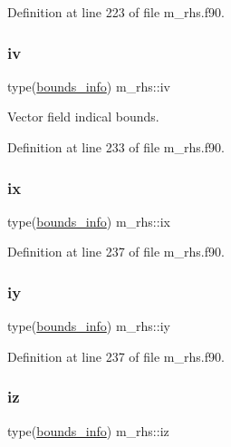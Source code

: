 Definition at line 223 of file m\+\_\+rhs.\+f90.

\mbox{\label{namespacem__rhs_a4ab97e22609b5ebbb97524ca7bae05ef}} 
\subsubsection{\texorpdfstring{iv}{iv}}
{\footnotesize\ttfamily type(\hyperlink{structm__derived__types_1_1bounds__info}{bounds\+\_\+info}) m\+\_\+rhs\+::iv}



Vector field indical bounds. 



Definition at line 233 of file m\+\_\+rhs.\+f90.

\mbox{\label{namespacem__rhs_a25b43c26b2e6ed431b9ec51d6af30c74}} 
\subsubsection{\texorpdfstring{ix}{ix}}
{\footnotesize\ttfamily type(\hyperlink{structm__derived__types_1_1bounds__info}{bounds\+\_\+info}) m\+\_\+rhs\+::ix}



Definition at line 237 of file m\+\_\+rhs.\+f90.

\mbox{\label{namespacem__rhs_a3d9a864b60496c110f161a93eebc86c6}} 
\subsubsection{\texorpdfstring{iy}{iy}}
{\footnotesize\ttfamily type(\hyperlink{structm__derived__types_1_1bounds__info}{bounds\+\_\+info}) m\+\_\+rhs\+::iy}



Definition at line 237 of file m\+\_\+rhs.\+f90.

\mbox{\label{namespacem__rhs_a83ac0b7807345a6879af324bae08c419}} 
\subsubsection{\texorpdfstring{iz}{iz}}
{\footnotesize\ttfamily type(\hyperlink{structm__derived__types_1_1bounds__info}{bounds\+\_\+info}) m\+\_\+rhs\+::iz}



